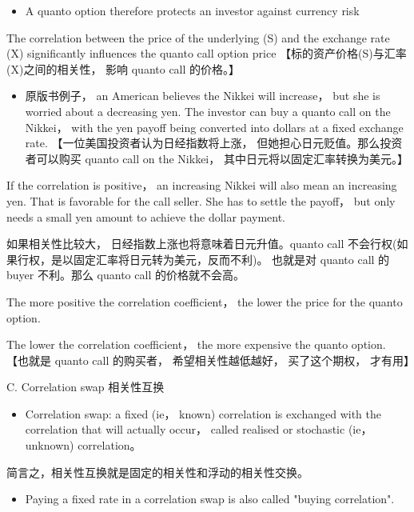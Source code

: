 \begin{itemize}
\item A quanto option therefore protects an investor against currency risk
\end{itemize}

 The correlation between the price of the underlying (S) and the exchange rate (X) significantly influences the quanto call option price 【标的资产价格(S)与汇率(X)之间的相关性， 影响 quanto call 的价格。】

\begin{itemize}
\item 原版书例子， an American believes the Nikkei will increase， but she is worried about a decreasing yen. The investor can buy a quanto call on the Nikkei， with the yen payoff being converted into dollars at a fixed exchange rate. 【一位美国投资者认为日经指数将上涨， 但她担心日元贬值。那么投资者可以购买 quanto call on the Nikkei， 其中日元将以固定汇率转换为美元。】
\end{itemize}

If the correlation is positive， an increasing Nikkei will also mean an increasing yen. That is favorable for the call seller. She has to settle the payoff， but only needs a small yen amount to achieve the dollar payment.

如果相关性比较大， 日经指数上涨也将意味着日元升值。quanto call 不会行权(如果行权，是以固定汇率将日元转为美元，反而不利)。 也就是对 quanto call 的 buyer 不利。那么 quanto call 的价格就不会高。

The more positive the correlation coefficient， the lower the price for the quanto option.

The lower the correlation coefficient， the more expensive the quanto option. 【也就是 quanto call 的购买者， 希望相关性越低越好， 买了这个期权， 才有用】

C. Correlation swap 相关性互换

\begin{itemize}
\item Correlation swap: a fixed (ie， known) correlation is exchanged with the correlation that will actually occur， called realised or stochastic (ie， unknown) correlation。
\end{itemize}

简言之，相关性互换就是固定的相关性和浮动的相关性交换。

\begin{itemize}
\item Paying a fixed rate in a correlation swap is also called "buying correlation".
\end{itemize}

